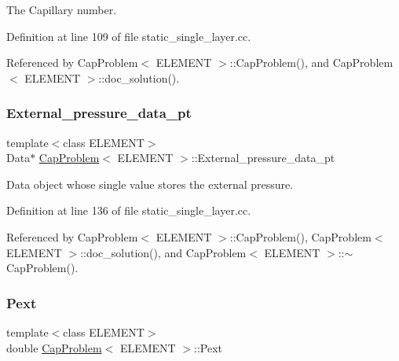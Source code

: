 The Capillary number. 



Definition at line 109 of file static\+\_\+single\+\_\+layer.\+cc.



Referenced by Cap\+Problem$<$ E\+L\+E\+M\+E\+N\+T $>$\+::\+Cap\+Problem(), and Cap\+Problem$<$ E\+L\+E\+M\+E\+N\+T $>$\+::doc\+\_\+solution().

\mbox{\label{classCapProblem_a3990e9e6a2e4545a470e84ff1fead5eb}} 
\subsubsection{\texorpdfstring{External\+\_\+pressure\+\_\+data\+\_\+pt}{External\_pressure\_data\_pt}}
{\footnotesize\ttfamily template$<$class E\+L\+E\+M\+E\+NT$>$ \\
Data$\ast$ \hyperlink{classCapProblem}{Cap\+Problem}$<$ E\+L\+E\+M\+E\+NT $>$\+::External\+\_\+pressure\+\_\+data\+\_\+pt\hspace{0.3cm}{\ttfamily [private]}}



Data object whose single value stores the external pressure. 



Definition at line 136 of file static\+\_\+single\+\_\+layer.\+cc.



Referenced by Cap\+Problem$<$ E\+L\+E\+M\+E\+N\+T $>$\+::\+Cap\+Problem(), Cap\+Problem$<$ E\+L\+E\+M\+E\+N\+T $>$\+::doc\+\_\+solution(), and Cap\+Problem$<$ E\+L\+E\+M\+E\+N\+T $>$\+::$\sim$\+Cap\+Problem().

\mbox{\label{classCapProblem_a6fcc40a7331c00739923b49c167b396f}} 
\subsubsection{\texorpdfstring{Pext}{Pext}}
{\footnotesize\ttfamily template$<$class E\+L\+E\+M\+E\+NT$>$ \\
double \hyperlink{classCapProblem}{Cap\+Problem}$<$ E\+L\+E\+M\+E\+NT $>$\+::Pext\hspace{0.3cm}{\ttfamily [private]}}



